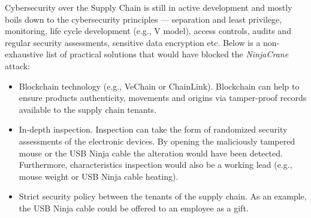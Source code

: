 Cybersecurity over the Supply Chain is still in active development and mostly boils down to the cybersecurity principles — separation and least privilege, monitoring, life cycle development (e.g., V model), access controls, audits and regular security assessments, sensitive data encryption etc. Below is a non-exhaustive list of practical solutions that would have blocked the \emph{NinjaCrane} attack:

\begin{itemize}
    \item Blockchain technology (e.g., VeChain or ChainLink). Blockchain can help to ensure products authenticity, movements and origins via tamper-proof records available to the supply chain tenants. 
    \item In-depth inspection. Inspection can take the form of randomized security assessments of the electronic devices. By opening the maliciously tampered mouse or the USB Ninja cable the alteration would have been detected. Furthermore, characteristics inspection would also be a working lead (e.g., mouse weight or USB Ninja cable heating).
    \item Strict security policy between the tenants of the supply chain. As an example, the USB Ninja cable could be offered to an employee as a gift.
\end{itemize}
